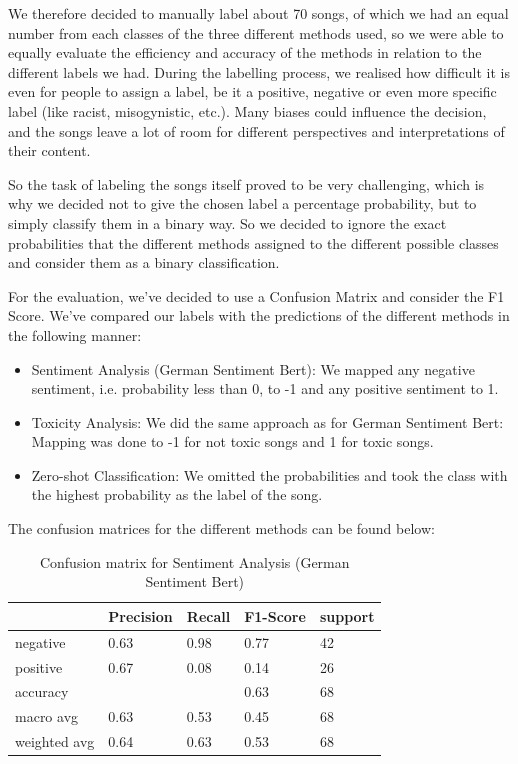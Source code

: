 We therefore decided to manually label about 70 songs, of which we had an equal number from each classes of the three different methods used, so we were able to equally evaluate the efficiency and accuracy of the methods in relation to the different labels we had. During the labelling process, we realised how difficult it is even for people to assign a label, be it a positive, negative or even more specific label (like racist, misogynistic, etc.). Many biases could influence the decision, and the songs leave a lot of room for different perspectives and interpretations of their content. 

So the task of labeling the songs itself proved to be very challenging, which is why we decided not to give the chosen label a percentage probability, but to simply classify them in a binary way. So we decided to ignore the exact probabilities that the different methods assigned to the different possible classes and consider them as a binary classification.

For the evaluation, we've decided to use a Confusion Matrix and consider the F1 Score.
We've compared our labels with the predictions of the different methods in the following manner:
\begin{itemize}
    \item Sentiment Analysis (German Sentiment Bert): We mapped any negative sentiment, i.e. probability less than 0, to -1 and any positive sentiment to 1.
    \item Toxicity Analysis: We did the same approach as for German Sentiment Bert: Mapping was done to -1 for not toxic songs and 1 for toxic songs.
    \item Zero-shot Classification: We omitted the probabilities and took the class with the highest probability as the label of the song.
\end{itemize}

The confusion matrices for the different methods can be found below:

\begin{table}[!htb]
    \centering
    \begin{tabular}{l|llll}
     & Precision & Recall & F1-Score & support \\ \hline \hline
    negative & 0.63 & 0.98 & 0.77 & 42\\
    positive & 0.67 & 0.08 & 0.14 & 26 \\ \hline
    accuracy & & & 0.63 & 68\\
    macro avg & 0.63 & 0.53 & 0.45 & 68 \\
    weighted avg & 0.64 & 0.63 & 0.53 & 68\\
    \end{tabular}
    \caption{Confusion matrix for Sentiment Analysis (German Sentiment Bert)}
    \label{tab:confusion_matrix_sentiment}
\end{table}

